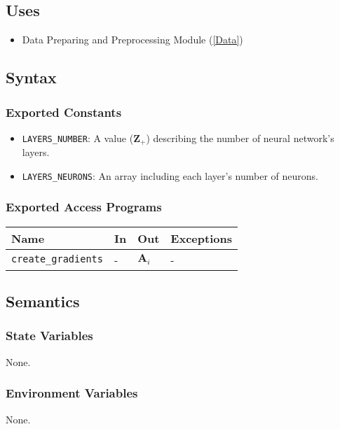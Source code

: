 \documentclass[12pt, titlepage]{article}
\def\code#1{\texttt{#1}}
\begin{document}
\subsection{Uses}
\begin{itemize}
  \item Data Preparing and Preprocessing Module (\ref{Data})
\end{itemize}


\subsection{Syntax}
\subsubsection{Exported Constants}
\begin{itemize}
  \item \code{LAYERS\_NUMBER}: A value ($\mathbf{Z}_{+}$) describing the number of 
  neural network's layers.
  \item \code{LAYERS\_NEURONS}: An array including each layer's number of neurons.
\end{itemize}

\subsubsection{Exported Access Programs}

\begin{center}
\begin{tabular}{p{3.5cm} p{4cm} p{4cm} p{3.5cm}}
\hline
\textbf{Name} & \textbf{In} & \textbf{Out} & \textbf{Exceptions} \\
\hline
\code{create\_gradients} & - & $\mathbf{A}_{i}$ & - \\
\hline
\end{tabular}
\end{center}

\subsection{Semantics}

\subsubsection{State Variables}
None.

\subsubsection{Environment Variables}
None.
\end{document}
